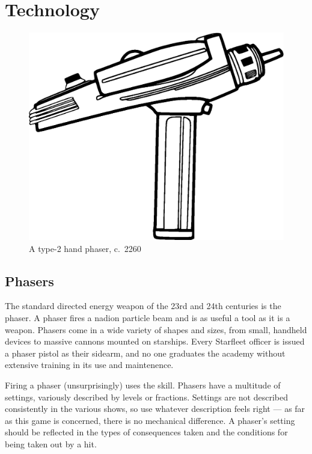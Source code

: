 \documentclass[12pt,titlepage,openany]{book}
\begin{document}
\chapter{\StarTrek{} Technology}\label{chap:star-trek-tech}

\begin{figure}
    \centering
    \includegraphics[width=0.8\linewidth]{img/Phaser.eps}\\
    \vspace{1ex}
    \small A type-2 hand phaser, c.\ 2260
\end{figure}

\section{Phasers}\label{sec:phasers}

The standard directed energy weapon of the 23rd and 24th centuries is the
phaser. A phaser fires a nadion particle beam and is as useful a tool as it is
a weapon. Phasers come in a wide variety of shapes and sizes, from small,
handheld devices to massive cannons mounted on starships. Every Starfleet
officer is issued a phaser pistol as their sidearm, and no one graduates the
academy without extensive training in its use and maintenence.

Firing a phaser (unsurprisingly) uses the  skill. Phasers have a
multitude of settings, variously described by levels or fractions. Settings are
not described consistently in the various \StarTrek{} shows, so use whatever
description feels right --- as far as this game is concerned, there is no
mechanical difference. A phaser's setting should be reflected in the types of
consequences taken and the conditions for being taken out by a hit.
\end{document}

